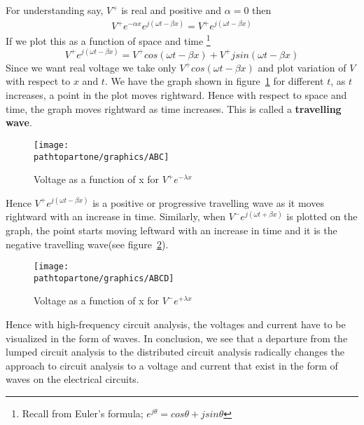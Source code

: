 For understanding say, $  V^{+} $ is real and positive and $ \alpha= 0 $ then
\begin{align*}
V^{+}e^{-\alpha x}e^{j( \omega t-\beta x)} = V^{+} e^{j( \omega t-\beta x)}
\end{align*}
If we plot this as a function of space and time
\footnote{Recall from Euler's formula; $ e^{j\theta} = cos\theta + jsin\theta $}
\begin{equation*}
V^{+}e^{j( \omega t-\beta x)} = V^{+}cos(\omega t- \beta x) +  V^{+}jsin(\omega t- \beta x)
\end{equation*}
Since we want real voltage we take only $ V^{+}cos(\omega t- \beta x) $ and plot variation of $ V $ with respect to $ x $ and $ t $. We have the graph shown in figure~\ref{fig:abc} for different $ t $, as $ t $ increases, a point in the plot moves rightward. Hence with respect to space and time, the graph moves rightward as time increases. This is called a \textbf{travelling wave}.
\begin{figure}[h]
\centering
\texttt{[image: \\pathtopartone/graphics/ABC]}
\caption{Voltage as a function of x for $V^+e^{-\lambda x}$}
\label{fig:abc}
\end{figure}

Hence  $ V^{+}e^{j(\omega t- \beta x )} $ is a positive or progressive travelling wave as it moves rightward with an increase in time. Similarly, when $ V^{-}e^{j( \omega t+ \beta x )} $ is plotted on the graph, the point starts moving leftward with an increase in time and it is the negative travelling wave(see figure~\ref{fig:abcd}).
\begin{figure}[h]
\centering
\texttt{[image: \\pathtopartone/graphics/ABCD]}
\caption{Voltage as a function of x for $V^-e^{+\lambda x}$}
\label{fig:abcd}
\end{figure}

Hence with high-frequency circuit analysis, the voltages and current have to be visualized in the form of waves. In conclusion, we see that a departure from the lumped circuit analysis to the distributed circuit analysis radically changes the approach to circuit analysis to a voltage and current that exist in the form of waves on the electrical circuits. 

